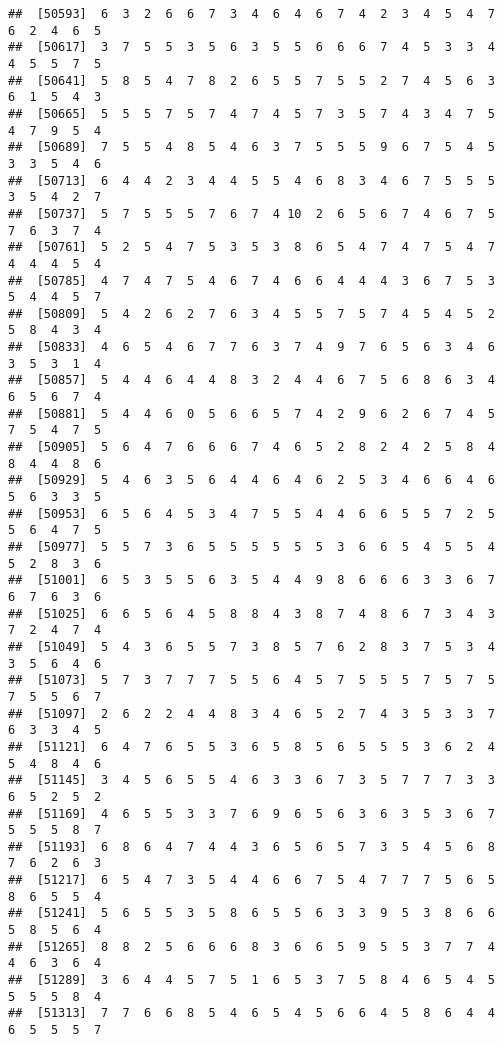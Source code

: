 \documentclass[
]{book}
\begin{document}
\begin{verbatim}
##  [50593]  6  3  2  6  6  7  3  4  6  4  6  7  4  2  3  4  5  4  7  6  2  4  6  5
##  [50617]  3  7  5  5  3  5  6  3  5  5  6  6  6  7  4  5  3  3  4  4  5  5  7  5
##  [50641]  5  8  5  4  7  8  2  6  5  5  7  5  5  2  7  4  5  6  3  6  1  5  4  3
##  [50665]  5  5  5  7  5  7  4  7  4  5  7  3  5  7  4  3  4  7  5  4  7  9  5  4
##  [50689]  7  5  5  4  8  5  4  6  3  7  5  5  5  9  6  7  5  4  5  3  3  5  4  6
##  [50713]  6  4  4  2  3  4  4  5  5  4  6  8  3  4  6  7  5  5  5  3  5  4  2  7
##  [50737]  5  7  5  5  5  7  6  7  4 10  2  6  5  6  7  4  6  7  5  7  6  3  7  4
##  [50761]  5  2  5  4  7  5  3  5  3  8  6  5  4  7  4  7  5  4  7  4  4  4  5  4
##  [50785]  4  7  4  7  5  4  6  7  4  6  6  4  4  4  3  6  7  5  3  5  4  4  5  7
##  [50809]  5  4  2  6  2  7  6  3  4  5  5  7  5  7  4  5  4  5  2  5  8  4  3  4
##  [50833]  4  6  5  4  6  7  7  6  3  7  4  9  7  6  5  6  3  4  6  3  5  3  1  4
##  [50857]  5  4  4  6  4  4  8  3  2  4  4  6  7  5  6  8  6  3  4  6  5  6  7  4
##  [50881]  5  4  4  6  0  5  6  6  5  7  4  2  9  6  2  6  7  4  5  7  5  4  7  5
##  [50905]  5  6  4  7  6  6  6  7  4  6  5  2  8  2  4  2  5  8  4  8  4  4  8  6
##  [50929]  5  4  6  3  5  6  4  4  6  4  6  2  5  3  4  6  6  4  6  5  6  3  3  5
##  [50953]  6  5  6  4  5  3  4  7  5  5  4  4  6  6  5  5  7  2  5  5  6  4  7  5
##  [50977]  5  5  7  3  6  5  5  5  5  5  5  3  6  6  5  4  5  5  4  5  2  8  3  6
##  [51001]  6  5  3  5  5  6  3  5  4  4  9  8  6  6  6  3  3  6  7  6  7  6  3  6
##  [51025]  6  6  5  6  4  5  8  8  4  3  8  7  4  8  6  7  3  4  3  7  2  4  7  4
##  [51049]  5  4  3  6  5  5  7  3  8  5  7  6  2  8  3  7  5  3  4  3  5  6  4  6
##  [51073]  5  7  3  7  7  7  5  5  6  4  5  7  5  5  5  7  5  7  5  7  5  5  6  7
##  [51097]  2  6  2  2  4  4  8  3  4  6  5  2  7  4  3  5  3  3  7  6  3  3  4  5
##  [51121]  6  4  7  6  5  5  3  6  5  8  5  6  5  5  5  3  6  2  4  5  4  8  4  6
##  [51145]  3  4  5  6  5  5  4  6  3  3  6  7  3  5  7  7  7  3  3  6  5  2  5  2
##  [51169]  4  6  5  5  3  3  7  6  9  6  5  6  3  6  3  5  3  6  7  5  5  5  8  7
##  [51193]  6  8  6  4  7  4  4  3  6  5  6  5  7  3  5  4  5  6  8  7  6  2  6  3
##  [51217]  6  5  4  7  3  5  4  4  6  6  7  5  4  7  7  7  5  6  5  8  6  5  5  4
##  [51241]  5  6  5  5  3  5  8  6  5  5  6  3  3  9  5  3  8  6  6  5  8  5  6  4
##  [51265]  8  8  2  5  6  6  6  8  3  6  6  5  9  5  5  3  7  7  4  4  6  3  6  4
##  [51289]  3  6  4  4  5  7  5  1  6  5  3  7  5  8  4  6  5  4  5  5  5  5  8  4
##  [51313]  7  7  6  6  8  5  4  6  5  4  5  6  6  4  5  8  6  4  4  6  5  5  5  7

\end{verbatim}
\end{document}
